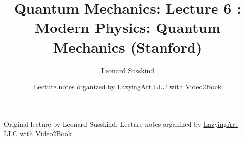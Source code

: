 \documentclass[11pt,oneside]{book}
\begin{document}
\frontmatter
\title{Quantum Mechanics: Lecture 6 : Modern Physics: Quantum Mechanics (Stanford)}
\author{Leonard Susskind}
\date{Lecture notes organized by \href{https://lazying.art}{LazyingArt LLC} with \href{https://github.com/lachlanchen/Video2Book}{Video2Book}}
\maketitle
\begin{center}
\small Original lecture by Leonard Susskind. Lecture notes organized by \href{https://lazying.art}{LazyingArt LLC} with \href{https://github.com/lachlanchen/Video2Book}{Video2Book}.
\end{center}
\clearpage
\mainmatter

\end{document}
